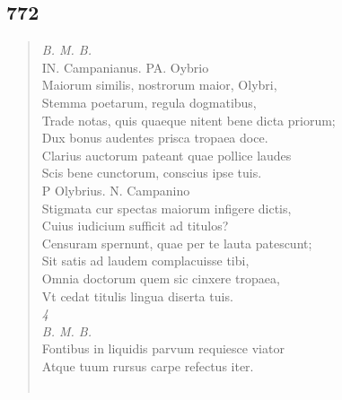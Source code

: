 \documentclass[11pt, a4paper]{report}
\begin{document}
            \subsection*{772}
      \begin{verse}
      \textit{B. M. B.} \\ IN. Campanianus. PA. Oybrio \\ Maiorum similis, nostrorum maior, Olybri, \\ Stemma poetarum, regula dogmatibus, \\ Trade notas, quis quaeque nitent bene dicta priorum; \\ Dux bonus audentes prisca tropaea doce. \\ Clarius auctorum pateant quae pollice laudes \\ Scis bene cunctorum, conscius ipse tuis. \\ P Olybrius. N. Campanino \\ Stigmata cur spectas maiorum infigere dictis, \\ Cuius iudicium sufficit ad titulos? \\ Censuram spernunt, quae per te lauta patescunt; \\ Sit satis ad laudem complacuisse tibi, \\ Omnia doctorum quem sic cinxere tropaea, \\ Vt cedat titulis lingua diserta tuis. \\ \textit{4} \\ \textit{B. M. B.} \\ Fontibus in liquidis parvum requiesce viator \\ Atque tuum rursus carpe refectus iter. \\ 
        ﻿\pagebreak 
    
      \end{verse}
  
            \subsection*{}
      \begin{verse}
      \end{verse}
  
\end{document}
